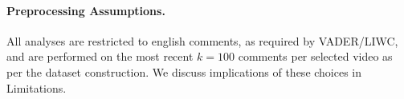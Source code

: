 \paragraph{Preprocessing Assumptions.} All analyses are restricted to english
comments, as required by VADER/LIWC, and are performed on the most recent $k=100$
comments per selected video as per the dataset construction. We discuss implications of
these choices in Limitations.

